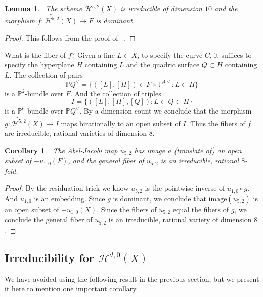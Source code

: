 \documentclass[amssymb,twoside,12 pt,amscd,reqno]{amsart}
\theoremstyle{plain}
\newtheorem{cor}[thm]{Corollary}
\newtheorem{lem}[thm]{Lemma}
\theoremstyle{definition}
\newcommand{\Hdg}[2]{\mathcal{H}^{#1,#2}}
\newcommand{\PP}{\mathbb{P}}
\begin{document}
\begin{lem}~\label{lem-irr52}
The scheme $\Hdg{5}{2}(X)$ is irreducible of dimension $10$ and the
morphism $f:\widetilde{\Hdg{5}{2}}(X)\rightarrow F$ is dominant.
\end{lem}

\begin{proof}
This follows from the proof of ~\cite[theorem 10.1]{HRS1}.
\end{proof}

What is the fiber of $f$?  Given a line $L\subset X$, to specify the
curve $C$, it suffices to specify the hyperplane $H$ containing $L$
and the quadric surface $Q\subset H$ containing $L$.  The collection
of pairs 
\begin{equation}
\PP Q^\vee = \{([L],[H])\in F\times \PP^{4\vee}: L\subset H\}
\end{equation}
is a $\PP^2$-bundle over $F$.  And the collection of triples
\begin{equation}
I=\{([L],[H],[Q]): L\subset Q\subset H\}
\end{equation}
is a $\PP^6$-bundle over $\PP Q^\vee$.  By a dimension count we
conclude that the morphism $g:\widetilde{\Hdg{5}{2}}(X)\rightarrow I$
maps birationally to an open subset of $I$.  Thus the fibers of $f$
are irreducible, rational varieties of dimension $8$.

\begin{cor}~\label{cor-urfib52}
The Abel-Jacobi map $u_{5,2}$ has image a (translate of) an open
subset of 
$-u_{1,0}(F)$, and the general fiber of $u_{5,2}$
is an irreducible, rational $8$-fold.
\end{cor}

\begin{proof}
By the residuation trick we know $u_{5,2}$ is the pointwise inverse of
$u_{1,0}\circ g$.  And $u_{1,0}$ is an embedding.  Since $g$ is
dominant, we conclude that $\text{image}(u_{5,2})$ is an open subset
of $-u_{1,0}(X)$.  Since the fibers of $u_{5,2}$ equal the fibers of
$g$, we conclude the general fiber of $u_{5,2}$ is an irreducible,
rational variety of dimension $8$.
\end{proof}


\subsection{Irreducibility for $\Hdg{d}{0}(X)$}

We have avoided using the following result in the previous section,
but we present it here to mention one important corollary.
\end{document}
